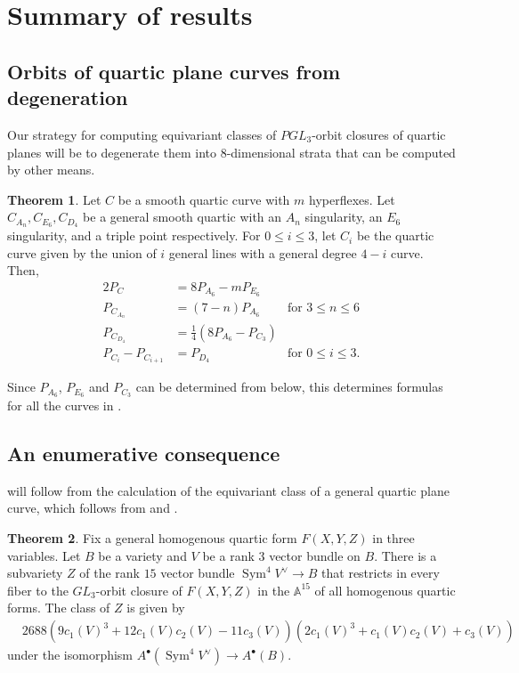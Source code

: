 \documentclass{article}
\theoremstyle{definition}
\newtheorem{thm}{Theorem}[section]
\newcommand{\on}{\operatorname}
\newcommand{\mb}{\mathbb}
\begin{document}
\section{Summary of results}
\subsection{Orbits of quartic plane curves from degeneration}
Our strategy for computing equivariant classes of $PGL_3$-orbit closures of quartic planes will be to degenerate them into 8-dimensional strata that can be computed by other means. 

\begin{thm}
\label{alldegenerations}
Let $C$ be a smooth quartic curve with $m$ hyperflexes. Let $C_{A_n}, C_{E_6}, C_{D_4}$ be a general smooth quartic with an $A_n$ singularity, an $E_6$ singularity, and a triple point respectively. For $0\leq i\leq 3$, let $C_i$ be the quartic curve given by the union of $i$ general lines with a general degree $4-i$ curve. Then,
\begin{alignat*}{2}
    P_{C} &= 8P_{A_6}-mP_{E_6}\\
    P_{C_{A_n}}&= (7-n)P_{A_6}&\text{for $3\leq n\leq 6$}\\
    P_{C_{D_4}}&=\frac{1}{4}(8P_{A_6}-P_{C_3})\\
    P_{C_{i}}-P_{C_{i+1}} &= P_{D_4} &\text{for $0\leq i\leq 3$}.
\end{alignat*}
\end{thm}
Since $P_{A_6}$, $P_{E_6}$ and $P_{C_3}$ can be determined from  below, this determines formulas for all the curves in .

\subsection{An enumerative consequence}

 will follow from the calculation of the equivariant class of a general quartic plane curve, which follows from  and . 
\begin{thm}
\label{quarticthom}
Fix a general homogenous quartic form $F(X,Y,Z)$ in three variables. Let $B$ be a variety and $V$ be a rank 3 vector bundle on $B$. There is a subvariety $Z$ of the rank $15$ vector bundle $\on{Sym}^4V^{\vee}\to B$ that restricts in every fiber to the $GL_3$-orbit closure of $F(X,Y,Z)$ in the $\mb{A}^{15}$ of all homogenous quartic forms. The class of $Z$ is given by
\begin{align*}
     &2688 (9 c_1(V)^3 + 12 c_1(V) c_2(V) - 11 c_3(V)) (2 c_1(V)^3 + c_1(V) c_2(V) + c_3(V))
\end{align*}
under the isomorphism $A^{\bullet}(\on{Sym}^4V^{\vee})\to A^{\bullet}(B)$.
\end{thm}
\end{document}
